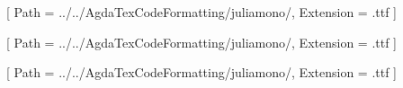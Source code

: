 
\usepackage{listings}
\usepackage{xcolor}
\RequirePackage{fontspec}
\usepackage[framemethod=tikz]{mdframed}
\usepackage{adjustbox}
\usepackage{tikzpagenodes}
\usetikzlibrary{calc}

\newfontfamily{}[
    Path      = ../../AgdaTexCodeFormatting/juliamono/,
    Extension = .ttf
    ]

\newfontfamily{}[
    Path      = ../../AgdaTexCodeFormatting/juliamono/,
    Extension = .ttf
    ]
    
\newfontfamily{}[
    Path      = ../../AgdaTexCodeFormatting/juliamono/,
    Extension = .ttf
    ]
    

\newcommand{\constarr}[1]{→} %
\newcommand{\consttimes}[1]{×} %
\newcommand{\constnat}[1]{$\NN$} %
\newcommand{\constbool}[1]{$\BB$} %
\newcommand{\constarrleft}[1]{←} %
\newcommand{\constsigma}[1]{Σ} %
\newcommand{\consttimesSL}[1]{{\JuliaMonoNormal{\_}×}} %
\newcommand{\consttimesSR}[1]{{×\JuliaMonoNormal{\_}}} %
\newcommand{\consttimesSLSR}[1]{\JuliaMonoNormal{\_}×\JuliaMonoNormal{\_}} %
\newcommand{\constforall}[1]{∀} %
\newcommand{\consttop}[1]{⊤} %
\newcommand{\constexists}[1]{∃} %
\newcommand{\constimpl}[1]{⇒} %
\newcommand{\constbiimpl}[1]{⇐} %
\newcommand{\constequiv}[1]{≡} %
\newcommand{\constentails}[1]{⊨} %
\newcommand{\constleq}[1]{≤} %
\newcommand{\constgeq}[1]{≥} %
\newcommand{\constbot}[1]{⊥} %
\newcommand{\constnotentails}[1] {$\not\models$} %
\newcommand{\constbiimplarr}[1]{↔} %
\newcommand{\constcompose}[1]{∘} %
\newcommand{\constOmega}[1]{Ω} %
\newcommand{\constRational}[1]{$\QQ$} %
\newcommand{\constConj}[1]{∧} %
\newcommand{\constDisj}[1]{∨} %
\newcommand{\constmapsto}[1]{↦} %
\newcommand{\constepsilon}[1]{ϵ} %
\newcommand{\constdelta}[1]{δ} %
\newcommand{\consttopbot}[1]{$_\constbot^\consttop$} %
\newcommand{\constinv}[1]{$^{-1}$} %
\newcommand{\constmu}[1]{μ} %
\newcommand{\constReal}[1]{$\RR$} %
\newcommand{\constProbab}[1]{$\PP$} %
\newcommand{\constnequiv}[1]{≢} %
\newcommand{\constint}[1]{$\ZZ$} %
\newcommand{\constpi}[1]{Π} %


